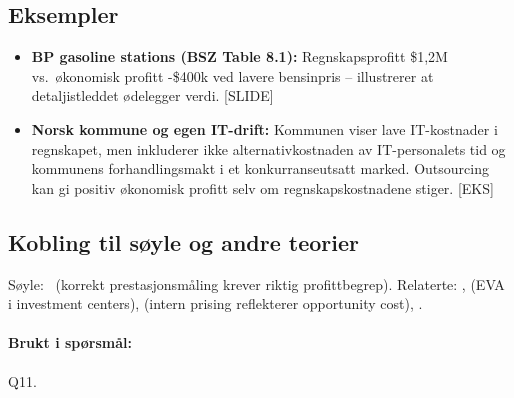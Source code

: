 \subsection*{Eksempler}
\begin{itemize}\setlength{\itemsep}{2pt}
\item \textbf{BP gasoline stations (BSZ Table 8.1):} Regnskapsprofitt \$1{,}2M vs.\ økonomisk profitt -\$400k ved lavere bensinpris -- illustrerer at detaljistleddet ødelegger verdi. [SLIDE]
\item \textbf{Norsk kommune og egen IT-drift:} Kommunen viser lave IT-kostnader i regnskapet, men inkluderer ikke alternativkostnaden av IT-personalets tid og kommunens forhandlingsmakt i et konkurranseutsatt marked. Outsourcing kan gi positiv økonomisk profitt selv om regnskapskostnadene stiger. [EKS]
\end{itemize}

\subsection*{Kobling til søyle og andre teorier}
Søyle: \STwo\ (korrekt prestasjonsmåling krever riktig profittbegrep). Relaterte: ,  (EVA i investment centers),  (intern prising reflekterer opportunity cost), .

\paragraph{Brukt i spørsmål:} Q11.
